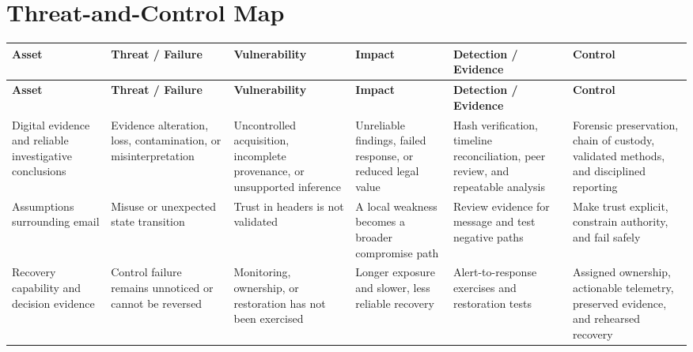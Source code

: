 \documentclass[11pt,letterpaper]{article}
\begin{document}
\section*{Threat-and-Control Map}
\begingroup\scriptsize\setlength{\tabcolsep}{2pt}
\begin{longtable}{>{\raggedright\arraybackslash}p{}>{\raggedright\arraybackslash}p{}>{\raggedright\arraybackslash}p{}>{\raggedright\arraybackslash}p{}>{\raggedright\arraybackslash}p{}>{\raggedright\arraybackslash}p{}}
\toprule\rowcolor{Navy}\color{white}\textbf{Asset} & \color{white}\textbf{Threat / Failure} & \color{white}\textbf{Vulnerability} & \color{white}\textbf{Impact} & \color{white}\textbf{Detection / Evidence} & \color{white}\textbf{Control}\\\midrule
\endfirsthead
\toprule\rowcolor{Navy}\color{white}\textbf{Asset} & \color{white}\textbf{Threat / Failure} & \color{white}\textbf{Vulnerability} & \color{white}\textbf{Impact} & \color{white}\textbf{Detection / Evidence} & \color{white}\textbf{Control}\\\midrule
\endhead
Digital evidence and reliable investigative conclusions & Evidence alteration, loss, contamination, or misinterpretation & Uncontrolled acquisition, incomplete provenance, or unsupported inference & Unreliable findings, failed response, or reduced legal value & Hash verification, timeline reconciliation, peer review, and repeatable analysis & Forensic preservation, chain of custody, validated methods, and disciplined reporting\\\midrule
Assumptions surrounding email & Misuse or unexpected state transition & Trust in headers is not validated & A local weakness becomes a broader compromise path & Review evidence for message and test negative paths & Make trust explicit, constrain authority, and fail safely\\\midrule
Recovery capability and decision evidence & Control failure remains unnoticed or cannot be reversed & Monitoring, ownership, or restoration has not been exercised & Longer exposure and slower, less reliable recovery & Alert-to-response exercises and restoration tests & Assigned ownership, actionable telemetry, preserved evidence, and rehearsed recovery\\\midrule
\bottomrule
\end{longtable}
\endgroup
\end{document}
